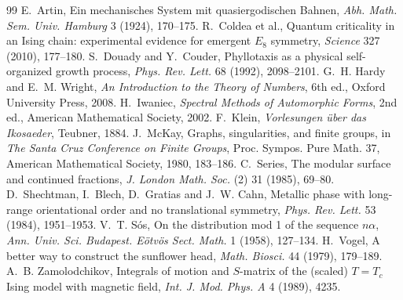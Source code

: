 \documentclass[11pt]{article}
\begin{document}
\begin{thebibliography}{99}
 E.~Artin, Ein mechanisches System mit quasiergodischen Bahnen, \emph{Abh. Math. Sem. Univ. Hamburg} 3 (1924), 170--175.
 R.~Coldea et al., Quantum criticality in an Ising chain: experimental evidence for emergent $E_8$ symmetry, \emph{Science} 327 (2010), 177--180.
 S.~Douady and Y.~Couder, Phyllotaxis as a physical self-organized growth process, \emph{Phys. Rev. Lett.} 68 (1992), 2098--2101.
 G.~H. Hardy and E.~M. Wright, \emph{An Introduction to the Theory of Numbers}, 6th ed., Oxford University Press, 2008.
 H.~Iwaniec, \emph{Spectral Methods of Automorphic Forms}, 2nd ed., American Mathematical Society, 2002.
 F.~Klein, \emph{Vorlesungen \"uber das Ikosaeder}, Teubner, 1884.
 J.~McKay, Graphs, singularities, and finite groups, in \emph{The Santa Cruz Conference on Finite Groups}, Proc. Sympos. Pure Math. 37, American Mathematical Society, 1980, 183--186.
 C.~Series, The modular surface and continued fractions, \emph{J. London Math. Soc.} (2) 31 (1985), 69--80.
 D.~Shechtman, I.~Blech, D.~Gratias and J.~W. Cahn, Metallic phase with long-range orientational order and no translational symmetry, \emph{Phys. Rev. Lett.} 53 (1984), 1951--1953.
 V.~T. S\'os, On the distribution mod 1 of the sequence $n\alpha$, \emph{Ann. Univ. Sci. Budapest. E\"otv\"os Sect. Math.} 1 (1958), 127--134.
 H.~Vogel, A better way to construct the sunflower head, \emph{Math. Biosci.} 44 (1979), 179--189.
 A.~B. Zamolodchikov, Integrals of motion and $S$-matrix of the (scaled) $T=T_c$ Ising model with magnetic field, \emph{Int. J. Mod. Phys. A} 4 (1989), 4235.
\end{thebibliography}
\end{document}
